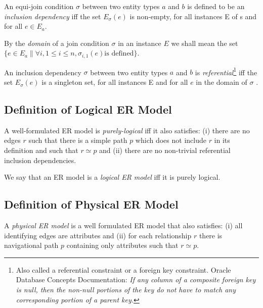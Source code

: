 \documentclass[10pt,a4paper]{article}
\newcommand{\term}[1]{\textit{{#1}}}
\begin{document}
\begin{definition}
An equi-join condition  $\sigma$ between two entity types $a$ and $b$ is defined to be an 
\term{inclusion dependency}
iff the set $E_\sigma(e)$ is non-empty, for all instances E of s and for all $e \in E_a$. \\
\end{definition}

\noindent
By the \term{domain} of a join condition $\sigma$ in an instance $E$ we shall mean the  set $\{ e \in E_a \| \forall i, 1 \leq i \leq n, \sigma_{i,1}(e) \mbox{is defined} \}$. \\


\begin{definition}
An inclusion dependency $\sigma$ between two entity types $a$ and $b$ is 
\term{referential}\footnote{Also called a referential constraint or a foreign key constraint. Oracle Database Concepts Documentation: \textit{If any column of a composite foreign key is null, then the non-null portions of the key do not have to match any corresponding portion of a parent key.}  } 
iff the set $E_\sigma(e)$ is a singleton set, for all instances E and for all $e$ in the domain of  $\sigma$ . 
\end{definition}
	
\subsection{Definition of Logical ER Model}

\begin{definition}
A well-formulated ER model is \term{purely-logical}  iff it 
also satisfies:
(i) 
there are no edges $r$ such that there is 
a simple path $p$ which does not include $r$ in its definition and such that $r \simeq p$  
and (ii)
 there are no non-trivial referential inclusion dependencies. \\
\end{definition}

\noindent
We say that an ER model is a \term{logical ER model} iff it is purely logical.

\subsection{Definition of Physical ER Model}
\begin{definition}
\noindent 
A \term{physical ER model} is a well formulated ER model
that also satisfies:
 (i) all identifying edges are attributes and 
(ii) for each relationship $r$ there is navigational path $p$ containing only attributes such that $r \simeq p$. 
\end{definition}
\end{document}
